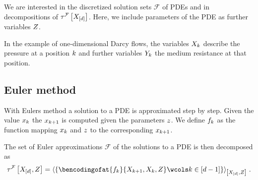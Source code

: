 \documentclass[aps,onecolumn,nofootinbib,pra]{article}
\begin{document}
    We are interested in the discretized solution sets $\mathcal{F}$ of PDEs and in decompositions of $\tau^{\mathcal{F}}\left[X_{[d]}\right]$.
    Here, we include parameters of the PDE as further variables $Z$.

    \begin{example}
        In the example of one-dimensional Darcy flows, the variables $X_{k}$ describe the pressure at a position $k$ and further variables $Y_{k}$ the medium resistance at that position.
    \end{example}

    \subsection{Euler method}

    With Eulers method a solution to a PDE is approximated step by step.
    Given the value $x_{k}$ the $x_{k+1}$ is computed given the parameters $z$.
    We define $f_{k}$ as the function mapping $x_{k}$ and $z$ to the corresponding $x_{k+1}$.

    The set of Euler approximations $\mathcal{F}$ of the solutions to a PDE is then decomposed as
    \begin{align*}
        \hypercoreofat{\mathcal{F}}{\shortcatvariables,\thirdcatvariable}
        = \contractionof{
            \{\bencodingofat{\formulaof{\catenumerator}}{\catvariableof{\catenumerator+1},\catvariableof{\catenumerator},\thirdcatvariable}
            \wcols \catenumerator\in[\catorder-1]\}
        }{\shortcatvariables,\thirdcatvariable} \, .
    \end{align*}
\end{document}
